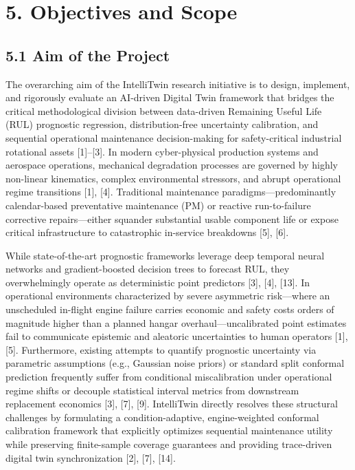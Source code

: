 \documentclass[12pt,a4paper]{article}
\begin{document}
\section*{5. Objectives and Scope}

\subsection*{5.1 Aim of the Project}
The overarching aim of the IntelliTwin research initiative is to design, implement, and rigorously evaluate an AI-driven Digital Twin framework that bridges the critical methodological division between data-driven Remaining Useful Life (RUL) prognostic regression, distribution-free uncertainty calibration, and sequential operational maintenance decision-making for safety-critical industrial rotational assets [1]--[3]. In modern cyber-physical production systems and aerospace operations, mechanical degradation processes are governed by highly non-linear kinematics, complex environmental stressors, and abrupt operational regime transitions [1], [4]. Traditional maintenance paradigms—predominantly calendar-based preventative maintenance (PM) or reactive run-to-failure corrective repairs—either squander substantial usable component life or expose critical infrastructure to catastrophic in-service breakdowns [5], [6]. 

While state-of-the-art prognostic frameworks leverage deep temporal neural networks and gradient-boosted decision trees to forecast RUL, they overwhelmingly operate as deterministic point predictors [3], [4], [13]. In operational environments characterized by severe asymmetric risk—where an unscheduled in-flight engine failure carries economic and safety costs orders of magnitude higher than a planned hangar overhaul—uncalibrated point estimates fail to communicate epistemic and aleatoric uncertainties to human operators [1], [5]. Furthermore, existing attempts to quantify prognostic uncertainty via parametric assumptions (e.g., Gaussian noise priors) or standard split conformal prediction frequently suffer from conditional miscalibration under operational regime shifts or decouple statistical interval metrics from downstream replacement economics [3], [7], [9]. IntelliTwin directly resolves these structural challenges by formulating a condition-adaptive, engine-weighted conformal calibration framework that explicitly optimizes sequential maintenance utility while preserving finite-sample coverage guarantees and providing trace-driven digital twin synchronization [2], [7], [14].
\end{document}
